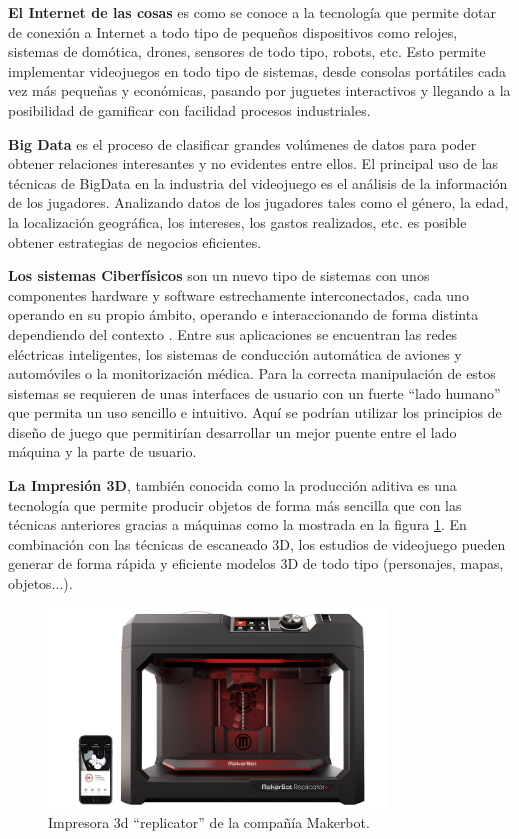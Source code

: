 \textbf{El Internet de las cosas} es como se conoce a la tecnología que permite dotar de conexión a Internet a todo tipo de pequeños dispositivos como relojes, sistemas de domótica, drones, sensores de todo tipo, robots, etc. Esto permite implementar videojuegos en todo tipo de sistemas, desde consolas portátiles cada vez más pequeñas y económicas, pasando por juguetes interactivos y llegando a la posibilidad de gamificar con facilidad procesos industriales.

\textbf{Big Data} es el proceso de clasificar grandes volúmenes de datos para poder obtener relaciones interesantes y no evidentes entre ellos. El principal uso de las técnicas de BigData en la industria del videojuego es el análisis de la información de los jugadores. Analizando datos de los jugadores tales como el género, la edad, la localización geográfica, los intereses, los gastos realizados, etc. es posible obtener estrategias de negocios eficientes.

\textbf{Los sistemas Ciberfísicos} son un nuevo tipo de sistemas con unos componentes hardware y software estrechamente interconectados, cada uno operando en su propio ámbito, operando e interaccionando de forma distinta dependiendo del contexto \cite{cyber_physics}. Entre sus aplicaciones se encuentran las redes eléctricas inteligentes, los sistemas de conducción automática de aviones y automóviles o la monitorización médica. Para la correcta manipulación de estos sistemas se requieren de unas interfaces de usuario con un fuerte ``lado humano'' que permita un uso sencillo e intuitivo. Aquí se podrían utilizar los principios de diseño de juego que permitirían desarrollar un mejor puente entre el lado máquina y la parte de usuario.

\textbf{La Impresión 3D}, también conocida como la producción aditiva es una tecnología que permite producir objetos de forma más sencilla que con las técnicas anteriores gracias a máquinas como la mostrada en la figura \ref{impresion-3d}. En combinación con las técnicas de escaneado 3D, los estudios de videojuego pueden generar de forma rápida y eficiente modelos 3D de todo tipo (personajes, mapas, objetos...).

\begin{figure}[h]
    \centering
    \includegraphics[width=0.8\textwidth]{images/estadodelarte/mercado/impresion-3d}
    \caption{Impresora 3d ``replicator'' de la compañía Makerbot.}
    \label{impresion-3d}
\end{figure}

